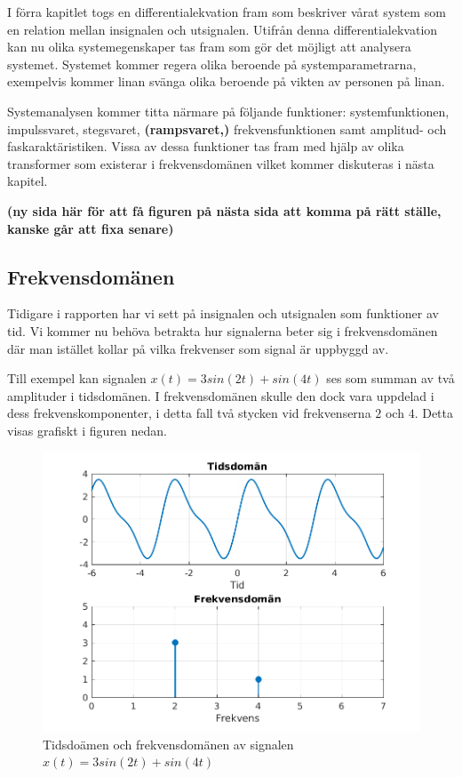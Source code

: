 I förra kapitlet togs en differentialekvation fram som beskriver vårat system som en relation mellan insignalen och utsignalen. Utifrån denna differentialekvation kan nu olika systemegenskaper tas fram som gör det möjligt att analysera systemet. Systemet kommer regera olika beroende på systemparametrarna, exempelvis kommer linan svänga olika beroende på vikten av personen på linan.

Systemanalysen kommer titta närmare på följande funktioner: systemfunktionen, impulssvaret, stegsvaret, \textbf{(rampsvaret,)} frekvensfunktionen samt amplitud- och faskaraktäristiken.
Vissa av dessa funktioner tas fram med hjälp av olika transformer som existerar i frekvensdomänen vilket kommer diskuteras i nästa kapitel.

\textbf{(ny sida här för att få figuren på nästa sida att komma på rätt ställe, kanske går att fixa senare)}

\newpage
\subsection{Frekvensdomänen}
Tidigare i rapporten har vi sett på insignalen och utsignalen som funktioner av tid. Vi kommer nu behöva betrakta hur signalerna beter sig i frekvensdomänen där man istället kollar på vilka frekvenser som signal är uppbyggd av.

Till exempel kan signalen $x(t)=3sin(2t) + sin(4t)$ ses som summan av två amplituder i tidsdomänen. I frekvensdomänen skulle den dock vara uppdelad i dess frekvenskomponenter, i detta fall två stycken vid frekvenserna $2$ och $4$. Detta visas grafiskt i figuren nedan.

\begin{figure}[h] %
    \centering
    \includegraphics{bilder/tid_vs_frekvens_exempel}
    \caption{Tidsdoämen och frekvensdomänen av signalen $x(t)=3sin(2t)+sin(4t)$}
    \label{fig:tid_vs_frekvens_exempel}
\end{figure}


